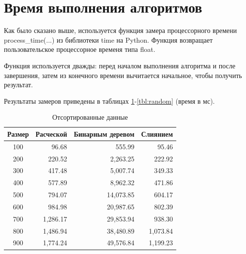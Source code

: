 \section{Время выполнения алгоритмов}

Как было сказано выше, используется функция замера процессорного времени process\_time(...) из библиотеки time на Python. Функция возвращает пользовательское процессорное временя типа float.

Функция используется дважды: перед началом выполнения алгоритма и после завершения, затем из конечного времени вычитается начальное, чтобы получить результат.

Результаты замеров приведены в таблицах \ref{tbl:best}-\ref{tbl:random} (время в мс).

\begin{table}[h]
	\begin{center}
		\begin{threeparttable}
		\captionsetup{singlelinecheck=off}
		\caption{Отсортированные данные}
		\label{tbl:best}
		\begin{tabular}{|c|r|r|r|}
			\hline
			Размер & Расческой & Бинарным деревом & Слиянием \\
			\hline
			  100 & 96.68 & 555.99 & 95.46 \\ 
			\hline
			200 & 220.52 & \multicolumn{1}{|r|}{2,263.25} & 222.92 \\ 
			\hline
			300 & 417.48 & \multicolumn{1}{|r|}{5,007.74} & 349.33 \\ 
			\hline
			400 & 577.89 & \multicolumn{1}{|r|}{8,962.32} & 471.86 \\ 
			\hline
			500 & 794.07 & \multicolumn{1}{|r|}{14,073.85} & 604.17 \\ 
			\hline
			600 & 984.98 & \multicolumn{1}{|r|}{20,987.65} & 802.39 \\ 
			\hline
			700 & \multicolumn{1}{|r|}{1,286.17} & \multicolumn{1}{|r|}{29,853.94} & 938.30 \\ 
			\hline
			800 & \multicolumn{1}{|r|}{1,486.94} & \multicolumn{1}{|r|}{38,480.89} & \multicolumn{1}{|r|}{1,073.84} \\ 
			\hline
			900 & \multicolumn{1}{|r|}{1,774.24} & \multicolumn{1}{|r|}{49,576.84} & \multicolumn{1}{|r|}{1,199.23} \\ 
			\hline
		\end{tabular}
		\end{threeparttable}
    \end{center}
\end{table}


